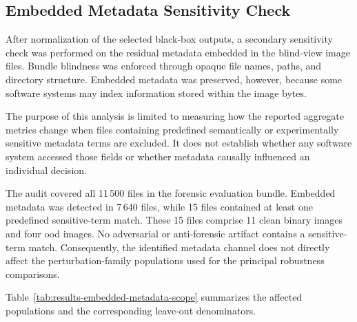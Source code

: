 \subsection{Embedded Metadata Sensitivity Check}
\label{subsec:results-embedded-metadata-sensitivity}

After normalization of the selected black-box outputs, a secondary sensitivity
check was performed on the residual metadata embedded in the blind-view image
files. Bundle blindness was enforced through opaque file names, paths, and
directory structure. Embedded metadata was preserved, however, because some
software systems may index information stored within the image bytes.

The purpose of this analysis is limited to measuring how the reported aggregate
metrics change when files containing predefined semantically or experimentally
sensitive metadata terms are excluded. It does not establish whether any
software system accessed those fields or whether metadata causally influenced
an individual decision.

The audit covered all 11\,500 files in the forensic evaluation bundle. Embedded
metadata was detected in 7\,640 files, while 15 files contained at least one
predefined sensitive-term match. These 15 files comprise 11 clean binary images
and four \gls{ood} images. No adversarial or anti-forensic artifact contains a
sensitive-term match. Consequently, the identified metadata channel does not
directly affect the perturbation-family populations used for the principal
robustness comparisons.

Table~\ref{tab:results-embedded-metadata-scope} summarizes the affected
populations and the corresponding leave-out denominators.

